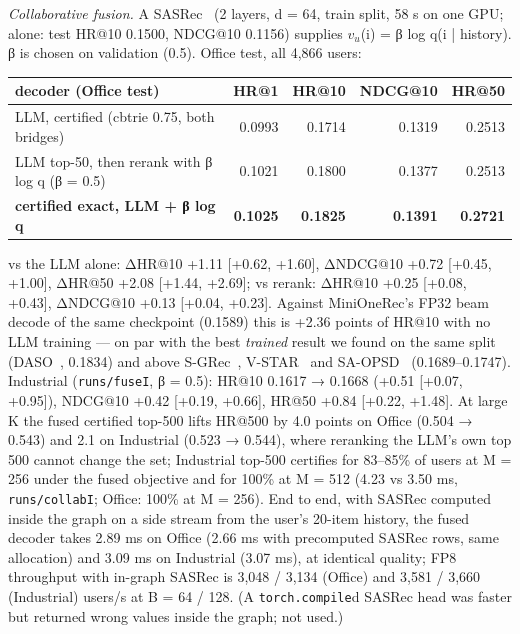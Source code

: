 \documentclass[11pt]{article}
\newcommand{\code}[1]{\texttt{#1}}
\begin{document}
\emph{Collaborative fusion.} A SASRec~\cite{kang2018} (2 layers, d = 64, train split, 58 s on one GPU; alone: test HR@10 0.1500, NDCG@10 0.1156) supplies $v_{u}$(i) = β log q(i | history). β is chosen on validation (0.5). Office test, all 4,866 users:

{\small
\setlength{\tabcolsep}{4pt}
\begin{longtable}{lrrrr}
\toprule
decoder (Office test) & HR@1 & HR@10 & NDCG@10 & HR@50 \\
\midrule
\endhead
LLM, certified (cbtrie 0.75, both bridges) & 0.0993 & 0.1714 & 0.1319 & 0.2513 \\
LLM top-50, then rerank with β log q (β = 0.5) & 0.1021 & 0.1800 & 0.1377 & 0.2513 \\
\textbf{certified exact, LLM + β log q} & \textbf{0.1025} & \textbf{0.1825} & \textbf{0.1391} & \textbf{0.2721} \\
\bottomrule
\end{longtable}
}

vs the LLM alone: ΔHR@10 +1.11 [+0.62, +1.60], ΔNDCG@10 +0.72 [+0.45, +1.00], ΔHR@50 +2.08 [+1.44, +2.69]; vs rerank: ΔHR@10 +0.25 [+0.08, +0.43], ΔNDCG@10 +0.13 [+0.04, +0.23]. Against MiniOneRec's FP32 beam decode of the same checkpoint (0.1589) this is +2.36 points of HR@10 with no LLM training — on par with the best \emph{trained} result we found on the same split (DASO~\cite{ax2608.20611}, 0.1834) and above S-GRec~\cite{ax2602.10606}, V-STAR~\cite{ax2602.10699} and SA-OPSD~\cite{ax2611.01568} (0.1689–0.1747). Industrial (\code{runs/\allowbreak{}fuseI}, β = 0.5): HR@10 0.1617 → 0.1668 (+0.51 [+0.07, +0.95]), NDCG@10 +0.42 [+0.19, +0.66], HR@50 +0.84 [+0.22, +1.48]. At large K the fused certified top-500 lifts HR@500 by 4.0 points on Office (0.504 → 0.543) and 2.1 on Industrial (0.523 → 0.544), where reranking the LLM's own top 500 cannot change the set; Industrial top-500 certifies for 83–85\% of users at M = 256 under the fused objective and for 100\% at M = 512 (4.23 vs 3.50 ms, \code{runs/\allowbreak{}collabI}; Office: 100\% at M = 256). End to end, with SASRec computed inside the graph on a side stream from the user's 20-item history, the fused decoder takes 2.89 ms on Office (2.66 ms with precomputed SASRec rows, same allocation) and 3.09 ms on Industrial (3.07 ms), at identical quality; FP8 throughput with in-graph SASRec is 3,048 / 3,134 (Office) and 3,581 / 3,660 (Industrial) users/s at B = 64 / 128. (A \code{torch.compile}d SASRec head was faster but returned wrong values inside the graph; not used.)
\end{document}
